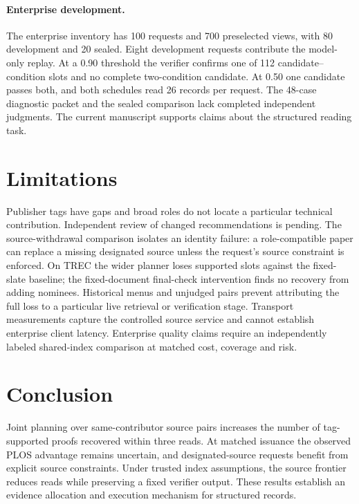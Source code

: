 \documentclass[sigconf,natbib=true,anonymous=true,pbalance=true]{acmart}
\begin{document}
\paragraph{Enterprise development.}
The enterprise inventory has 100 requests and 700 preselected views, with 80 development and 20 sealed. Eight development requests contribute the model-only replay. At a 0.90 threshold the verifier confirms one of 112 candidate--condition slots and no complete two-condition candidate. At 0.50 one candidate passes both, and both schedules read 26 records per request. The 48-case diagnostic packet and the sealed comparison lack completed independent judgments. The current manuscript supports claims about the structured reading task.

\section{Limitations}
Publisher tags have gaps and broad roles do not locate a particular technical contribution. Independent review of changed recommendations is pending. The source-withdrawal comparison isolates an identity failure: a role-compatible paper can replace a missing designated source unless the request's source constraint is enforced. On TREC the wider planner loses supported slots against the fixed-slate baseline; the fixed-document final-check intervention finds no recovery from adding nominees. Historical menus and unjudged pairs prevent attributing the full loss to a particular live retrieval or verification stage. Transport measurements capture the controlled source service and cannot establish enterprise client latency. Enterprise quality claims require an independently labeled shared-index comparison at matched cost, coverage and risk.

\section{Conclusion}
Joint planning over same-contributor source pairs increases the number of tag-supported proofs recovered within three reads. At matched issuance the observed PLOS advantage remains uncertain, and designated-source requests benefit from explicit source constraints. Under trusted index assumptions, the source frontier reduces reads while preserving a fixed verifier output. These results establish an evidence allocation and execution mechanism for structured records.



\end{document}
